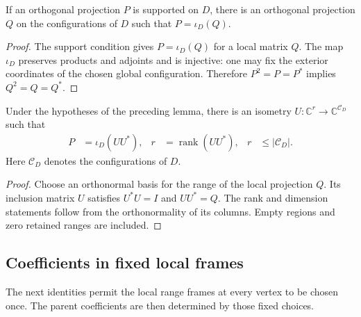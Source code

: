\begin{lemma}
    \label{lem:supported_projection_local_coordinates}
    \leanok
    If an orthogonal projection $P$ is supported on $D$, there is an
    orthogonal projection $Q$ on the configurations of $D$ such that
    $P=\iota_D(Q)$.
\end{lemma}
\begin{proof}\leanok
    The support condition gives $P=\iota_D(Q)$ for a local matrix $Q$.
    The map $\iota_D$ preserves products and adjoints and is injective:
    one may fix the exterior coordinates of the chosen global configuration.
    Therefore $P^2=P=P^*$ implies $Q^2=Q=Q^*$.
\end{proof}

\begin{theorem}
    \label{thm:supported_projection_local_range}
    \leanok
    Under the hypotheses of the preceding lemma, there is an isometry
    $U:\mathbb C^r\longrightarrow\mathbb C^{\mathcal C_D}$ such that
    \begin{align}
        P&=\iota_D(UU^*),&
        r&=\operatorname{rank}(UU^*),&
        r&\le |\mathcal C_D|.
        \label{eq:supported_projection_local_range}
    \end{align}
    Here $\mathcal C_D$ denotes the configurations of $D$.
\end{theorem}
\begin{proof}\leanok
    Choose an orthonormal basis for the range of the local projection $Q$.
    Its inclusion matrix $U$ satisfies $U^*U=I$ and $UU^*=Q$.
    The rank and dimension statements follow from the orthonormality
    of its columns. Empty regions and zero retained ranges are included.
\end{proof}


\subsection{Coefficients in fixed local frames}

The next identities permit the local range frames at every vertex to be chosen
once. The parent coefficients are then determined by those fixed choices.

